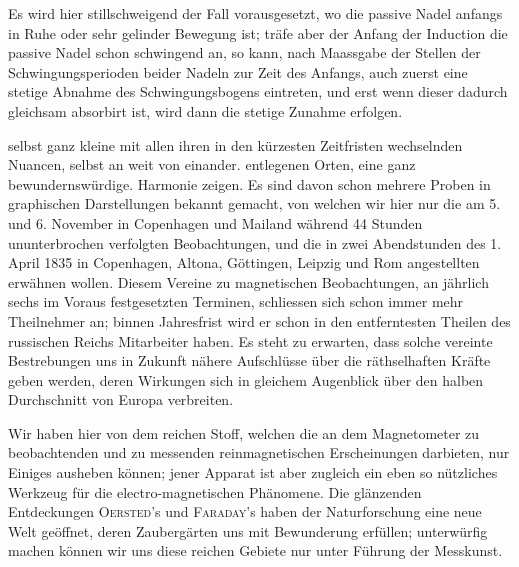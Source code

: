 \expandafter\def\csname HistoricalNoteText349\endcsname{Es wird hier stillschweigend der Fall vorausgesetzt, wo die passive Nadel anfangs in Ruhe oder sehr gelinder Bewegung ist; träfe aber der Anfang der Induction die passive Nadel schon schwingend an, so kann, nach Maassgabe der Stellen der Schwingungsperioden beider Nadeln zur Zeit des Anfangs, auch zuerst eine stetige Abnahme des Schwingungsbogens eintreten, und erst wenn dieser dadurch gleichsam absorbirt ist, wird dann die stetige Zunahme erfolgen.}
\par\clearpage
{}
\noindent selbst ganz kleine mit allen ihren in den kürzesten Zeitfristen wechselnden Nuancen, selbst an weit von einander. entlegenen Orten, eine ganz bewundernswürdige. Harmonie zeigen. Es sind davon schon mehrere Proben in graphischen Darstellungen bekannt gemacht, von welchen wir hier nur die am 5. und 6. November in Copenhagen und Mailand während 44 Stunden ununterbrochen verfolgten Beobachtungen, und die in zwei Abendstunden des 1. April 1835 in Copenhagen, Altona, Göttingen, Leipzig und Rom angestellten erwähnen wollen. Diesem Vereine zu magnetischen Beobachtungen, an jährlich sechs im Voraus festgesetzten Terminen, schliessen sich schon immer mehr Theilnehmer an; binnen Jahresfrist wird er schon in den entferntesten Theilen des russischen Reichs Mitarbeiter haben. Es steht zu erwarten, dass solche vereinte Bestrebungen uns in Zukunft nähere Aufschlüsse über die räthselhaften Kräfte geben werden, deren Wirkungen sich in gleichem Augenblick über den halben Durchschnitt von Europa verbreiten.

Wir haben hier von dem reichen Stoff, welchen die an dem Magnetometer zu beobachtenden und zu messenden reinmagnetischen Erscheinungen darbieten, nur Einiges ausheben können; jener Apparat ist aber zugleich ein eben so nützliches Werkzeug für die electro-magnetischen Phänomene. Die glänzenden Entdeckungen \textsc{Oersted}'s und \textsc{Faraday}'s haben der Naturforschung eine neue Welt geöffnet, deren Zaubergärten uns mit Bewunderung erfüllen; unterwürfig machen können wir uns diese reichen Gebiete nur unter Führung der Messkunst.

